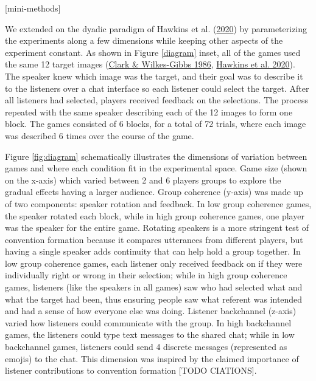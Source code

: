 \documentclass[
  english,
  a4paper,
]{article}
\begin{document}
{[}mini-methods{]}

We extended on the dyadic paradigm of Hawkins et al. (\protect\hyperlink{ref-hawkinsCharacterizingDynamicsLearning2020}{2020}) by parameterizing the experiments along a few dimensions while keeping other aspects of the experiment constant. As shown in Figure \ref{diagram} inset, all of the games used the same 12 target images (\protect\hyperlink{ref-clarkReferringCollaborativeProcess1986}{Clark \& Wilkes-Gibbs 1986}, \protect\hyperlink{ref-hawkinsCharacterizingDynamicsLearning2020}{Hawkins et al. 2020}). The speaker knew which image was the target, and their goal was to describe it to the listeners over a chat interface so each listener could select the target. After all listeners had selected, players received feedback on the selections. The process repeated with the same speaker describing each of the 12 images to form one block. The games consisted of 6 blocks, for a total of 72 trials, where each image was described 6 times over the course of the game.

Figure \ref{fig:diagram} schematically illustrates the dimensions of variation between games and where each condition fit in the experimental space. Game size (shown on the x-axis) which varied between 2 and 6 players groups to explore the gradual effects having a larger audience. Group coherence (y-axis) was made up of two components: speaker rotation and feedback. In low group coherence games, the speaker rotated each block, while in high group coherence games, one player was the speaker for the entire game. Rotating speakers is a more stringent test of convention formation because it compares utterances from different players, but having a single speaker adds continuity that can help hold a group together. In low group coherence games, each listener only received feedback on if they were individually right or wrong in their selection; while in high group coherence games, listeners (like the speakers in all games) saw who had selected what and what the target had been, thus ensuring people saw what referent was intended and had a sense of how everyone else was doing. Listener backchannel (z-axis) varied how listeners could communicate with the group. In high backchannel games, the listeners could type text messages to the shared chat; while in low backchannel games, listeners could send 4 discrete messages (represented as emojis) to the chat. This dimension was inspired by the claimed importance of listener contributions to convention formation {[}TODO CIATIONS{]}.
\end{document}
